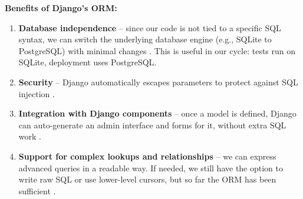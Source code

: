 \medskip

\noindent
\textbf{Benefits of Django’s ORM:}
\begin{enumerate}
	\item \textbf{Database independence} – since our code is not tied to a 
	specific SQL syntax, we can switch the underlying database engine (e.g., 
	SQLite to PostgreSQL) with minimal changes \parencite{DjangoORMQueries}. 
	This is useful in our cycle: tests run on SQLite, deployment uses PostgreSQL.
	
	\item \textbf{Security} – Django automatically escapes parameters to 
	protect against SQL injection \parencite{DjangoSecurity}.
	
	\item \textbf{Integration with Django components} – once a model is 
	defined, Django can auto-generate an admin interface and forms for it, 
	without extra SQL work \parencite{DjangoAdmin}.
	
	\item \textbf{Support for complex lookups and relationships} – we can 
	express advanced queries in a readable way. If needed, we still have the 
	option to write raw SQL or use lower-level cursors, but so far the ORM has 
	been sufficient \parencite{DjangoRawSQL}.
\end{enumerate}
